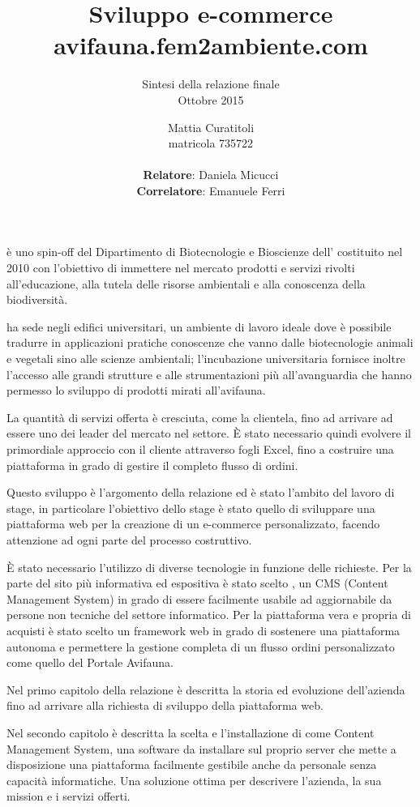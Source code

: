 \documentclass[12pt,a4paper]{scrartcl}
\author{
	Mattia Curatitoli \\ 
	matricola 735722 \\
	\\
	\textbf{Relatore}: Daniela Micucci \\
	\textbf{Correlatore}: Emanuele Ferri
}
\title{Sviluppo e-commerce avifauna.fem2ambiente.com}
\subtitle{
	Sintesi della relazione finale \\
 	Ottobre 2015
}
\date{}
\begin{document}
\maketitle


\textbf{\femsrl} è uno spin-off del Dipartimento di Biotecnologie e Bioscienze dell'{\unimib} costituito nel 2010 con l'obiettivo di immettere nel mercato prodotti e servizi rivolti all'educazione, alla tutela delle risorse ambientali e alla conoscenza della biodiversità. 

{\fem} ha sede negli edifici universitari, un ambiente di lavoro ideale dove è possibile tradurre in applicazioni pratiche conoscenze che vanno dalle biotecnologie animali e vegetali sino alle scienze ambientali; l'incubazione universitaria fornisce inoltre l'accesso alle grandi strutture e alle strumentazioni più all'avanguardia che hanno permesso lo sviluppo di prodotti mirati all'avifauna. 

La quantità di servizi offerta è cresciuta, come la clientela, fino ad arrivare ad essere uno dei leader del mercato nel settore. È stato necessario quindi evolvere il primordiale approccio con il cliente attraverso fogli Excel, fino a costruire una piattaforma in grado di gestire il completo flusso di ordini.

Questo sviluppo è l'argomento della relazione ed è stato l'ambito del lavoro di stage, in particolare l'obiettivo dello stage è stato quello di sviluppare una piattaforma web per la creazione di un e-commerce personalizzato, facendo attenzione ad ogni parte del processo costruttivo.

È stato necessario l'utilizzo di diverse tecnologie in funzione delle richieste. Per la parte del sito più informativa ed espositiva è stato scelto {\wp}, un CMS (Content Management System) in grado di essere facilmente usabile ad aggiornabile da persone non tecniche del settore informatico. Per la piattaforma vera e propria di acquisti è stato scelto un framework web in grado di sostenere una piattaforma autonoma e permettere la gestione completa di un flusso ordini personalizzato come quello del Portale Avifauna.
  
Nel primo capitolo della relazione è descritta la storia ed evoluzione dell'azienda {\femsrl} fino ad arrivare alla richiesta di sviluppo della piattaforma web. 

Nel secondo capitolo è descritta la scelta e l'installazione di {\wp} come Content Management System, una software da installare sul proprio server che mette a disposizione una piattaforma facilmente gestibile anche da personale senza capacità informatiche. Una soluzione ottima per descrivere l'azienda, la sua mission e i servizi offerti.
\end{document}
